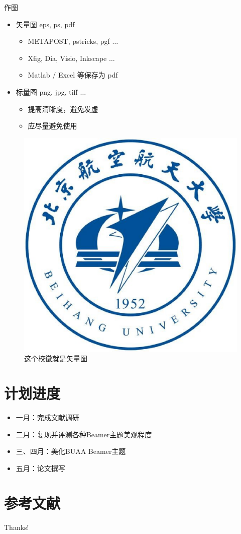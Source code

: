 \documentclass{beamer}
\begin{document}
\begin{frame}{作图}
	\begin{itemize}
		\item 矢量图 eps, ps, pdf
		      \begin{itemize}
			      \item METAPOST, pstricks, pgf $\ldots$
			      \item Xfig, Dia, Visio, Inkscape $\ldots$
			      \item Matlab / Excel 等保存为 pdf
		      \end{itemize}
		\item 标量图 png, jpg, tiff $\ldots$
		      \begin{itemize}
			      \item 提高清晰度，避免发虚
			      \item 应尽量避免使用
		      \end{itemize}
	\end{itemize}
	\begin{figure}[htpb]
		\centering
		\includegraphics[width=0.2\linewidth]{pic/buaa_log.eps}
		\caption{这个校徽就是矢量图}
	\end{figure}
\end{frame}

\section{计划进度}
\begin{frame}
	\begin{itemize}
		\item 一月：完成文献调研
		\item 二月：复现并评测各种Beamer主题美观程度
		\item 三、四月：美化BUAA Beamer主题
		\item 五月：论文撰写
	\end{itemize}
\end{frame}

\section{参考文献}

\begin{frame}[allowframebreaks]
	
	
\end{frame}

\begin{frame}
	\begin{center}
		{\Huge\calligra Thanks!}
	\end{center}
\end{frame}
\end{document}
